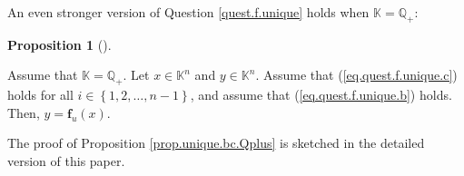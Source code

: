 \documentclass[numbers=enddot,12pt,final,onecolumn,notitlepage]{scrartcl}%
\theoremstyle{definition}
\newtheorem{prop}[theo]{Proposition}
\newenvironment{proposition}[1][]
{\begin{prop}[#1]\begin{leftbar}}
{\end{leftbar}\end{prop}}
\newenvironment{vershort}{}{}
\begin{document}
An even stronger version of Question \ref{quest.f.unique} holds when
$\mathbb{K}=\mathbb{Q}_{+}$:

\begin{proposition}
\label{prop.unique.bc.Qplus}Assume that $\mathbb{K}=\mathbb{Q}_{+}$. Let
$x\in\mathbb{K}^{n}$ and $y\in\mathbb{K}^{n}$. Assume that
(\ref{eq.quest.f.unique.c}) holds for all $i\in\left\{  1,2,\ldots
,n-1\right\}  $, and assume that (\ref{eq.quest.f.unique.b}) holds. Then,
$y=\mathbf{f}_{u}\left(  x\right)  $.
\end{proposition}

\begin{vershort}
The proof of Proposition \ref{prop.unique.bc.Qplus} is sketched in the
detailed version \cite{verlong} of this paper.
\end{vershort}
\end{document}
